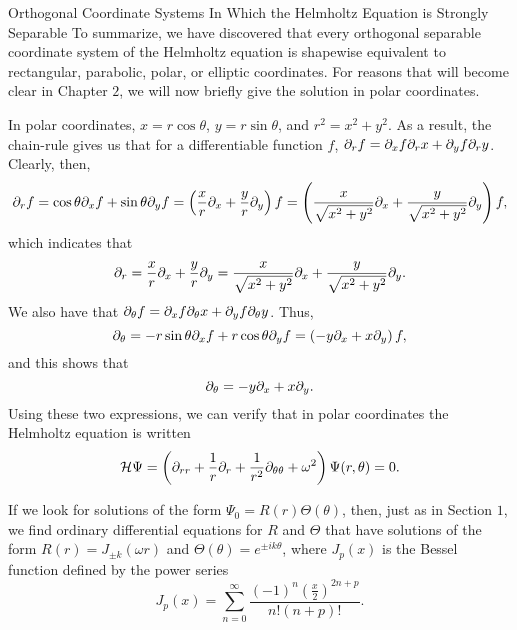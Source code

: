 \begin{section}{Orthogonal Coordinate Systems In Which the Helmholtz Equation is Strongly Separable}
To summarize, we have discovered that every orthogonal separable coordinate system of the Helmholtz equation is shapewise equivalent to rectangular, parabolic, polar, or elliptic coordinates.  For reasons that will become clear in Chapter $2$, we will now briefly give the solution in polar coordinates.

In polar coordinates, $x = r \cos \theta$, $y = r \sin \theta$, and $r^2 = x^2 + y^2$.  As a result, the chain-rule gives us that for a differentiable function $f$, $\partial_{r} f = \partial_{x} f \partial_{r} x + \partial_{y} f \partial_{r} y$.  Clearly, then,
\[
\partial_{r} f = \cos \theta \partial_{x} f + \sin \theta \partial_{y} f = \left( \frac{x}{r} \partial_{x} + \frac{y}{r} \partial_{y} \right) f = \left( \frac{x}{\sqrt{x^2 + y^2}} \partial_{x} + \frac{y}{\sqrt{x^2 + y^2}} \partial_{y} \right) f,
\]
which indicates that
\begin{equation}
\label{p r}
\partial_{r} = \frac{x}{r} \partial_{x} + \frac{y}{r} \partial_{y} = \frac{x}{\sqrt{x^2 + y^2}} \partial_{x} + \frac{y}{\sqrt{x^2 + y^2}} \partial_{y}.
\end{equation}
We also have that $\partial_{\theta} f = \partial_{x} f \partial_{\theta} x + \partial_{y} f \partial_{\theta} y$.  Thus,
\[
\partial_{\theta} = -r \sin \theta \partial_{x} f + r \cos \theta \partial_{y} f = \left( -y \partial_{x} + x \partial_{y} \right) f,
\]
and this shows that
\begin{equation}
\label{p theta}
\partial_{\theta} = -y \partial_{x} + x \partial_{y}.
\end{equation}
Using these two expressions, we can verify that in polar coordinates the Helmholtz equation is written
\begin{equation}
\label{helmpolar}
\mathcal{H} \Psi = \left( \partial_{r r} + \frac{1}{r} \partial_{r} + \frac{1}{r^2} \partial_{\theta \theta} + \omega^2 \right) \Psi(r,\theta) = 0.
\end{equation}

If we look for solutions of the form $\Psi_0 = R(r)\Theta(\theta)$, then, just as in Section $1$, we find ordinary differential equations for $R$ and $\Theta$ that have solutions of the form $R(r) = J_{\pm k}(\omega r)$ and $\Theta(\theta) = e^{\pm i k \theta}$, where $J_{p}(x)$ is the Bessel function defined by the power series
\[
J_{p}(x) = \sum_{n = 0}^\infty \frac{(-1)^n \left(\frac{x}{2}\right)^{2n + p}}{n! (n + p)!}.
\]

\end{section}